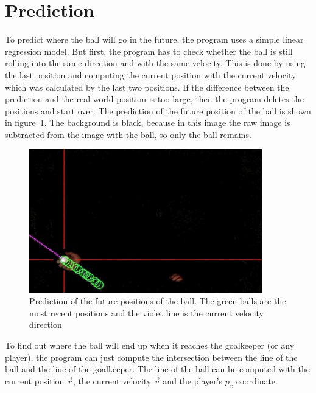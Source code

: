 \section{Prediction}\label{sec:prediction}
To predict where the ball will go in the future, the program uses a simple linear regression\autocite{linear_regression} model.
But first, the program has to check whether the ball is still rolling into the same direction and with the same velocity.
This is done by using the last position and computing the current position with the current velocity, which was calculated by the last two positions.
If the difference between the prediction and the real world position is too large, then the program deletes the positions and start over.
The prediction of the future position of the ball is shown in figure~\ref{fig:ball_prediction}.
The background is black, because in this image the raw image is subtracted from the image with the ball, so only the ball remains.
\begin{figure}[H]
    \centering
    \includegraphics[width=0.9\textwidth]{../photos/ball_prediction}
    \caption[ball-prediction]{Prediction of the future positions of the ball.
    The green balls are the most recent positions and the violet line is the current velocity direction}
    \label{fig:ball_prediction}
\end{figure}
To find out where the ball will end up when it reaches the goalkeeper (or any player), the program can just compute the intersection between the line of the ball and the line of the goalkeeper.
The line of the ball can be computed with the current position $\vec{r}$, the current velocity $\vec{v}$ and the player's $p_x$ coordinate.
